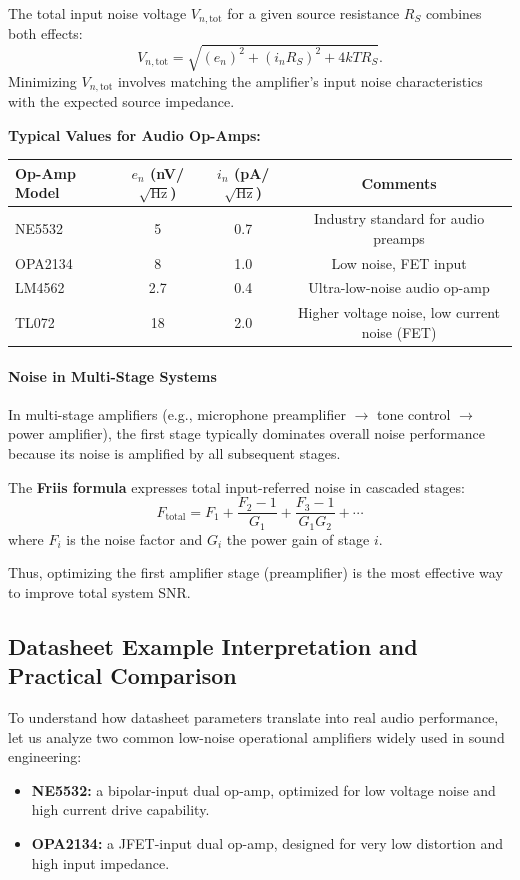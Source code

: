 The total input noise voltage $V_{n,\text{tot}}$ for a given source resistance \(R_S\) combines both effects:
\[
V_{n,\text{tot}} = \sqrt{ (e_n)^2 + (i_n R_S)^2 + 4 k T R_S }.
\]
Minimizing \(V_{n,\text{tot}}\) involves matching the amplifier’s input noise characteristics with the expected source impedance.

\textbf{Typical Values for Audio Op-Amps: }
\begin{center}
\begin{tabular}{|l|c|c|c|}
\hline
\textbf{Op-Amp Model} & \textbf{$e_n$ (nV/$\sqrt{\text{Hz}}$)} & \textbf{$i_n$ (pA/$\sqrt{\text{Hz}}$)} & \textbf{Comments} \\
\hline
NE5532 & 5 & 0.7 & Industry standard for audio preamps \\
OPA2134 & 8 & 1.0 & Low noise, FET input \\
LM4562 & 2.7 & 0.4 & Ultra-low-noise audio op-amp \\
TL072 & 18 & 2.0 & Higher voltage noise, low current noise (FET) \\
\hline
\end{tabular}
\end{center}

\paragraph{Noise in Multi-Stage Systems}
In multi-stage amplifiers (e.g., microphone preamplifier $\rightarrow$ tone control $\rightarrow$ power amplifier), the first stage typically dominates overall noise performance because its noise is amplified by all subsequent stages.

The \textbf{Friis formula} expresses total input-referred noise in cascaded stages:
\[
F_{\text{total}} = F_1 + \frac{F_2 - 1}{G_1} + \frac{F_3 - 1}{G_1 G_2} + \cdots
\]
where \(F_i\) is the noise factor and \(G_i\) the power gain of stage \(i\).

Thus, optimizing the first amplifier stage (preamplifier) is the most effective way to improve total system SNR.

\subsection{Datasheet Example Interpretation and Practical Comparison}

To understand how datasheet parameters translate into real audio performance, let us analyze two common low-noise operational amplifiers widely used in sound engineering:
\begin{itemize}
  \item \textbf{NE5532:} a bipolar-input dual op-amp, optimized for low voltage noise and high current drive capability.
  \item \textbf{OPA2134:} a JFET-input dual op-amp, designed for very low distortion and high input impedance.
\end{itemize}

